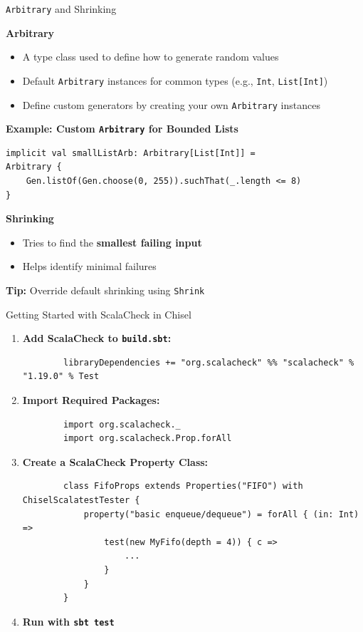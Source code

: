 \begin{frame}[fragile]{\texttt{Arbitrary} and Shrinking}
	
	\textbf{Arbitrary}
	\begin{itemize}
		\item A type class used to define how to generate random values
		\item Default \texttt{Arbitrary} instances for common types (e.g., \texttt{Int}, \texttt{List[Int]})
		\item Define custom generators by creating your own \texttt{Arbitrary} instances
	\end{itemize}
	\pause
	\vspace{0.5em}
	\textbf{Example: Custom \texttt{Arbitrary} for Bounded Lists}
	\begin{verbatim}
implicit val smallListArb: Arbitrary[List[Int]] = 
Arbitrary {
	Gen.listOf(Gen.choose(0, 255)).suchThat(_.length <= 8)
}
	\end{verbatim}
	\pause
	\textbf{Shrinking}
	\begin{itemize}
		\item Tries to find the \textbf{smallest failing input}
		\item Helps identify minimal failures
	\end{itemize}
	\textbf{Tip:} Override default shrinking  using \texttt{Shrink}
	
\end{frame}

\begin{frame}[fragile]{Getting Started with ScalaCheck in Chisel}
\scriptsize
\begin{enumerate}
	
	\item \textbf{Add ScalaCheck to \texttt{build.sbt}:}
	\begin{verbatim}
		libraryDependencies += "org.scalacheck" %% "scalacheck" % "1.19.0" % Test
	\end{verbatim}
	
	\item \textbf{Import Required Packages:}
	\begin{verbatim}
		import org.scalacheck._
		import org.scalacheck.Prop.forAll
	\end{verbatim}
	
	\item \textbf{Create a ScalaCheck Property Class:}
	\begin{verbatim}
		class FifoProps extends Properties("FIFO") with ChiselScalatestTester {
			property("basic enqueue/dequeue") = forAll { (in: Int) =>
				test(new MyFifo(depth = 4)) { c =>
					...
				}
			}
		}
	\end{verbatim}
	
	\item \textbf{Run with \texttt{sbt test}}
	
\end{enumerate}

\end{frame}

